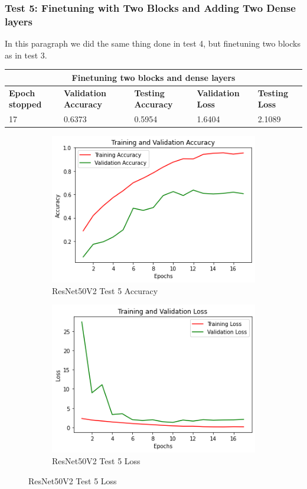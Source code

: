 \subsubsection{Test 5: Finetuning with Two Blocks and Adding Two Dense layers}
In this paragraph we did the same thing done in test 4, but finetuning two blocks as in test 3.

\medskip

\begin{tabular}{ |p{2cm}|p{2cm}|p{2cm}|p{2cm}|p{2cm}|  }
\hline
\multicolumn{5}{|c|}{Finetuning two blocks and dense layers} \\
\hline
\textbf{Epoch stopped} & \textbf{Validation Accuracy} & \textbf{Testing Accuracy} & \textbf{Validation Loss} & \textbf{Testing Loss} \\
\hline
17 & 0.6373 & 0.5954 & 1.6404 & 2.1089\\
\hline
\end{tabular}

\begin{figure}[H]
	\begin{subfigure}{0.5\textwidth}
		\includegraphics[width=0.9\linewidth]{img/resnet50v2/resnet50finetuned2denseacc.png} 
		\caption{ResNet50V2 Test 5 Accuracy}
		\label{fig:resnet50finetuned2denseacc}
	\end{subfigure}
	\begin{subfigure}{0.5\textwidth}
		\includegraphics[width=0.9\linewidth]{img/resnet50v2/resnet50finetuned2denseloss.png}
		\caption{ResNet50V2 Test 5 Loss}
		\label{fig:resnet50finetuned2denseloss}
	\end{subfigure}
\end{figure}


